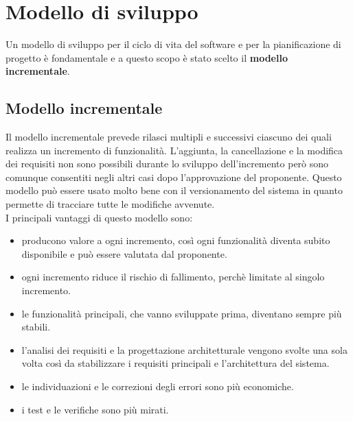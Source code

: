 \section{Modello di sviluppo}
Un modello di sviluppo per il ciclo di vita del software e per la pianificazione di progetto è fondamentale e a questo scopo è stato scelto il \textbf{modello incrementale}.

\subsection{Modello incrementale}
Il modello incrementale prevede rilasci multipli e successivi ciascuno dei quali realizza un incremento di funzionalità.
L'aggiunta, la cancellazione e la modifica dei requisiti non sono possibili durante lo sviluppo dell'incremento però sono comunque consentiti negli altri casi dopo l'approvazione del proponente.
Questo modello può essere usato molto bene con il versionamento del sistema in quanto permette di tracciare tutte le modifiche avvenute.\\
I principali vantaggi di questo modello sono:
\begin{itemize}
	\item producono valore a ogni incremento, così ogni funzionalità diventa subito disponibile e può essere valutata dal proponente.\\
	\item ogni incremento riduce il rischio di fallimento, perchè limitate al singolo incremento.\\
	\item le funzionalità principali, che vanno sviluppate prima, diventano sempre più stabili.\\
	\item l'analisi dei requisiti e la progettazione architetturale vengono svolte una sola volta così da stabilizzare i requisiti principali e l'architettura del sistema.\\
	\item le individuazioni e le correzioni degli errori sono più economiche. \\
	\item i test e le verifiche sono più mirati. \\
\end{itemize}

